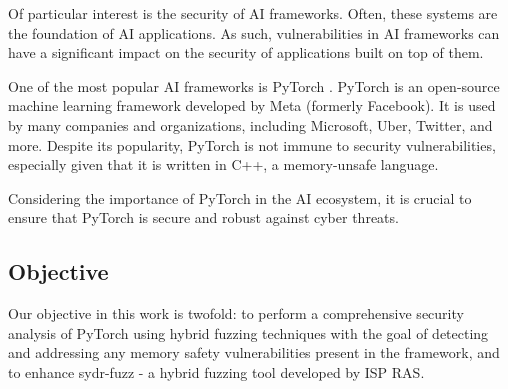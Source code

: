 Of particular interest is the security of AI frameworks. Often, these systems are the foundation of AI applications. As such, vulnerabilities in AI frameworks can have a significant impact on the security of applications built on top of them.

One of the most popular AI frameworks is PyTorch \cite{pytorch}. PyTorch is an open-source machine learning framework developed by Meta (formerly Facebook). It is used by many companies and organizations, including Microsoft, Uber, Twitter, and more. Despite its popularity, PyTorch is not immune to security vulnerabilities, especially given that it is written in C++, a memory-unsafe language.

Considering the importance of PyTorch in the AI ecosystem, it is crucial to ensure that PyTorch is secure and robust against cyber threats.

\subsection{Objective}

Our objective in this work is twofold: to perform a comprehensive security analysis of PyTorch using hybrid fuzzing techniques with the goal of detecting and addressing any memory safety vulnerabilities present in the framework, and to enhance sydr-fuzz \cite{sydr-cutting-edge-dynamic-symbolic-execution} - a hybrid fuzzing tool developed by ISP RAS.
